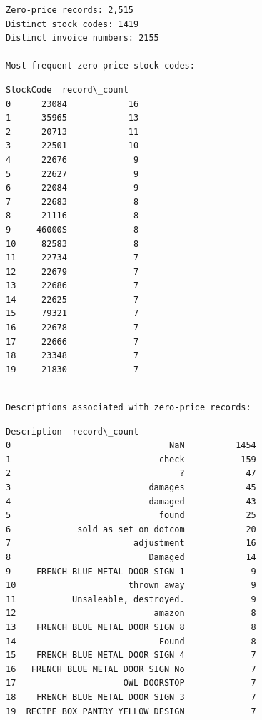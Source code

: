 \documentclass[11pt]{article}
\begin{document}
    \begin{Verbatim}[commandchars=\\\{\}]
Zero-price records: 2,515
Distinct stock codes: 1419
Distinct invoice numbers: 2155

Most frequent zero-price stock codes:
    \end{Verbatim}

    
    \begin{Verbatim}[commandchars=\\\{\}]
   StockCode  record\_count
0      23084            16
1      35965            13
2      20713            11
3      22501            10
4      22676             9
5      22627             9
6      22084             9
7      22683             8
8      21116             8
9     46000S             8
10     82583             8
11     22734             7
12     22679             7
13     22686             7
14     22625             7
15     79321             7
16     22678             7
17     22666             7
18     23348             7
19     21830             7
    \end{Verbatim}

    
    \begin{Verbatim}[commandchars=\\\{\}]

Descriptions associated with zero-price records:
    \end{Verbatim}

    
    \begin{Verbatim}[commandchars=\\\{\}]
                        Description  record\_count
0                               NaN          1454
1                             check           159
2                                 ?            47
3                           damages            45
4                           damaged            43
5                             found            25
6             sold as set on dotcom            20
7                        adjustment            16
8                           Damaged            14
9     FRENCH BLUE METAL DOOR SIGN 1             9
10                      thrown away             9
11           Unsaleable, destroyed.             9
12                           amazon             8
13    FRENCH BLUE METAL DOOR SIGN 8             8
14                            Found             8
15    FRENCH BLUE METAL DOOR SIGN 4             7
16   FRENCH BLUE METAL DOOR SIGN No             7
17                     OWL DOORSTOP             7
18    FRENCH BLUE METAL DOOR SIGN 3             7
19  RECIPE BOX PANTRY YELLOW DESIGN             7
    \end{Verbatim}
\end{document}
